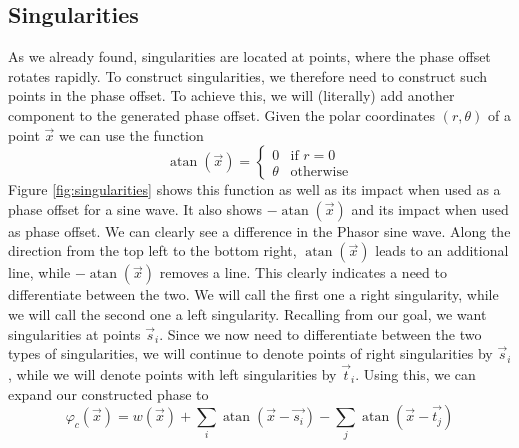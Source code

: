 \documentclass{utue} %
\DeclareMathOperator{\atan}{atan}
\begin{document}
\subsection{Singularities}
As we already found, singularities are located at points, where the phase offset rotates rapidly. To construct singularities, we therefore need to construct such points in the phase offset. To achieve this, we will (literally) add another component to the generated phase offset. Given the polar coordinates $(r, \theta)$ of a point $\vec{x}$ we can use the function
$$
\atan(\vec{x}) = \begin{cases}
  0 & \text{if } r = 0\\
  \theta &\text{otherwise}
\end{cases}
$$
Figure \ref{fig:singularities} shows this function as well as its impact when used as a phase offset for a sine wave. It also shows $-\atan(\vec{x})$ and its impact when used as phase offset. We can clearly see a difference in the Phasor sine wave. Along the direction from the top left to the bottom right, $\atan(\vec{x})$ leads to an additional line, while $-\atan(\vec{x})$ removes a line. This clearly indicates a need to differentiate between the two. We will call the first one a right singularity, while we will call the second one a left singularity. Recalling from our goal, we want singularities at points $\vec{s}_i$. Since we now need to differentiate between the two types of singularities, we will continue to denote points of right singularities by $\vec{s}_i$, while we will denote points with left singularities by $\vec{t}_i$. Using this, we can expand our constructed phase to
$$
\varphi_c(\vec{x}) = w(\vec{x}) + \sum_i \atan(\vec{x}-\vec{s_i}) - \sum_j \atan(\vec{x}-\vec{t_j})
$$
\end{document}
